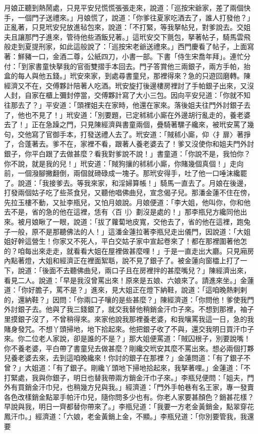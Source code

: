\begin{showcontents}{}
月娘正聽到熱鬧處，只見平安兒慌慌張張走來，說道：「巡按宋爺家，差了兩個快手，一個門子送禮來。」月娘慌了，說道：「你爹往夏家吃酒去了，誰人打發他？」正亂著，只見玳安兒放進毡包來，說道：「不打緊，等我拏帖兒，對爹說去。交姐夫且讓那門子進來，管待他些酒飯兒著。」這玳安交下氈包，拏著帖子，騎馬雲飛般走到夏提刑家，如此這般說了：「巡按宋老爺送禮來。」西門慶看了帖子，上面寫著：鮮豬一口，金酒二尊，公紙四刀，小書一部。下書「侍生宋喬年拜」。連忙分付：「到家書童快拏我的官衙雙摺手本回去。門子答賞他三兩銀子，兩方手帕，抬盒的每人與他五錢。」玳安來家，到處尋書童兒，那裡得來？急的只遊回磨轉。陳經濟又不在，交傅夥計陪著人吃酒。玳安旋打後邊樓房裡討了手帕銀子出來，又沒人封，自家在櫃上彌封停當，交傅夥計寫了大小三包。因向平安兒道：「你就不知往那去了？」平安道：「頭裡姐夫在家時，他還在家來。落後姐夫往門外討銀子去了，他也不見了！」玳安道：「別要題，已定秫秫小廝在外邊胡行亂走的，養老婆去了！」正在急躁之門，只見陳經濟與書童兩個，疊騎著騾子纔來，被玳安罵了幾句，交他寫了官御手本，打發送禮人去了。玳安道：「賊秫小廝，仰〈扌扉〉著掙了，合蓬著去。爹不在，家裡不看，跟著人養老婆去了！爹又沒使你和姐夫門外討銀子，你平白跟了去做甚麼？看我對爹說不說！」書童道：「你說不是，我怕你？你不說，就是我的兒！」玳安道：「賊狗攘的秫秫小廝，你賭幾個真個！」走向前，一個潑腳撇翻倒，兩個就磆碌成一塊子。那玳安得手，吐了他一口唾沫纔罷了。說道：「我接爹去。等我來家，和淫婦算帳！」騎馬一直去了。月娘在後邊，打發兩個姑子吃了些茶食兒，又聽他唱佛曲兒，宣念偈子兒。那潘金蓮不住在傍，先拉玉樓不動，又扯李瓶兒，又怕月娘說。月娘便道：「李大姐，他叫你，你和他去不是，省的急的他在這裡，恁有〈百刂〉劃沒是處的！」那李瓶兒方纔同他出來。被月娘瞅了一眼，說道：「拔了蘿蔔地皮寬，交他去了，省的他在這裡，跑兔子一般，原不是那聽佛法的人！」這潘金蓮拉著李瓶兒走出儀門，因說道：「大姐姐好幹這營生！你家又不死人，平白交姑子家中宣起卷來了！都在那裡圍著他怎的？咱每出來走走，就看看大姐在屋裡做甚麼哩！」于是一直走出大廳。只見廂房內點著燈，大姐和經濟正在裡面絮聒，說不見了銀子了。被金蓮向窗櫺上打了一下，說道：「後面不去聽佛曲兒，兩口子且在房裡拌的甚麼嘴兒？」陳經濟出來，看見二人。說道：「早是我沒曾罵出來！原來是五娘、六娘來了。請進來坐。」金蓮道：「你好膽子，罵不是？」進來，見大姐正在燈下納鞋，說道：「這咱晚熱剌剌的，還納鞋？」因問：「你兩口子嚷的是些甚麼？」陳經濟道：「你問他！爹使我門外討銀子去。他與了我三錢銀了，就交我替他稍銷金汗巾子來。不想到那裡，袖子里摸銀子沒了，不曾稍得來。來家他說我那裡養老婆，和我嚷罵我這一日，急的我賭身發咒。不想丫頭掃地，地下拾起來。他把銀子收了不與，還交我明日買汗巾子來。你二位老人家說，卻是誰的不是？」那大姐便罵道：「賊囚根子，別要說嘴！你不養老婆，平白帶了書童兒去做甚麼？剛纔交玳安其麼不罵出來。想必兩個打夥兒養老婆去來，去到這咱晚纔來！你討的銀子在那裡？」金蓮問道：「有了銀子不曾？」大姐道：「有了銀子。剛纔丫頭地下掃地拾起來，我拏著哩。」金蓮道：「不打緊處，我與你銀子，明日也替我帶兩方銷金汗巾子來。」李瓶兒便問：「姐夫，門外有買銷金汗巾兒，也稍幾方兒與我。」經濟道：「門外手帕巷有名王家，專一發賣各色改樣銷金點翠手帕汗巾兒，隨你問多少也有。你老人家要甚顏色？銷甚花樣？早說與我，明日一齊都替你帶來了。」李瓶兒道：「我要一方老金黃銷金，點翠穿花鳳汗巾。」經濟道：「六娘，老金黃銷上金，不顯。」李瓶兒道：「你別要管我，我還要
\end{showcontents}
